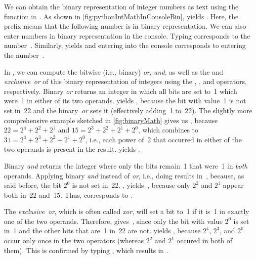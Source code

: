We can obtain the binary representation of integer numbers as text using the  function in \python.
As shown in \cref{fig:pythonIntMathInConsoleBin},  yields .
Here, the  prefix means that the following number is in binary representation.
We can also enter numbers in binary representation in the console.
Typing  corresponds to the number~.
Similarly,  yields  and entering  into the console corresponds to entering the number~.

In \python, we can compute the bitwise (i.e., binary) \emph{or}, \emph{and}, as well as the and \emph{exclusive~or} of this binary representation of integers using the \pythonil{|}, \pythonil{&}, and \pythonil{^} operators, respectively.
Binary \emph{or} returns an integer in which all bits are set to~1 which were~1 in either of its two operands.
\pythonIdx{|} yields , because the bit with value~1 is not set in~22 and the binary~\emph{or} sets it (effectively adding~1 to~22).
The slightly more comprehensive example  sketched in \cref{fig:binaryMath} gives us , because $22=2^4+2^2+2^1$ and $15=2^3+2^2+2^1+2^0$, which \pythonil{|} combines to $31=2^4+2^3+2^2+2^1+2^0$, i.e., each power of~2 that occurred in either of the two operands is present in the result.
 yields .

Binary \emph{and} returns the integer where only the bits remain~1 that were~1 in \emph{both} operands.
Applying binary \emph{and} instead of \emph{or}, i.e., doing \pythonIdx{\&} results in~, because, as said before, the bit $2^0$ is not set in~22.
, yields~, because only $2^2$ and $2^1$ appear both in~22 and~15.
Thus,  corresponds to .

The \emph{exclusive~or}, which is often called \emph{xor}, will set a bit to~1 if it is~1 in exactly one of the two operands.
Therefore, \pythonIdx{\^{}} gives~, since only the bit with value $2^0$ is set in~1 and the other bits that are~1 in~22 are not.
 yields , because $2^4$, $2^3$, and $2^0$ occur only once in the two operators (whereas $2^2$ and $2^1$ occured in both of them).
This is confirmed by typing , which results in .

